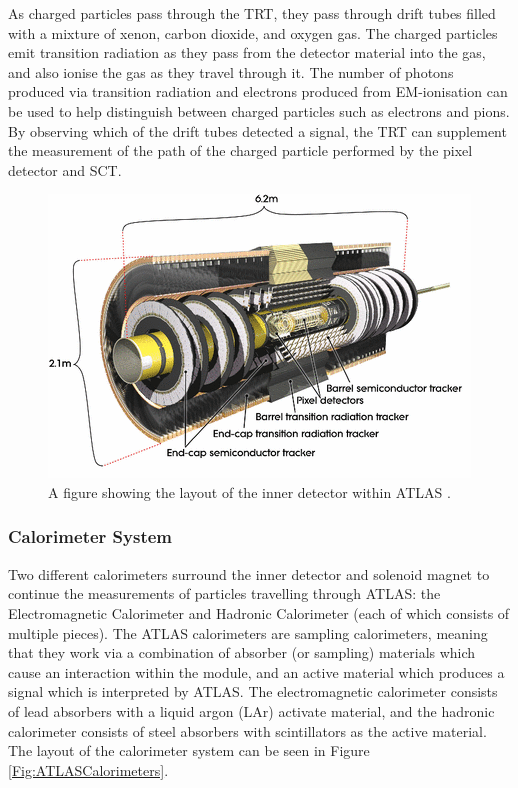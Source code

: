 \documentclass[12pt,a4paper,epsf,portrait,times,epsfig]{article}
\begin{document}
		As charged particles pass through the TRT, they pass through drift tubes filled with a mixture of xenon, carbon dioxide, and oxygen gas. The charged particles emit transition radiation as they pass from the detector material into the gas, and also ionise the gas as they travel through it. The number of photons produced via transition radiation and
		electrons produced from EM-ionisation can be used to help distinguish between charged	particles such as electrons and pions. By observing which of the drift tubes detected a	signal, the TRT can supplement the measurement of the path of the charged particle	performed by the pixel detector and SCT. \par
		
		
		\begin{figure}
			\centering
			\includegraphics[scale=0.7]{Inner_Detector}
			\caption{A figure showing the layout of the inner detector within ATLAS \cite{Article:ATLASDesignPaper}. }
			\label{Fig:InnerDetector}
		\end{figure}
		
		\subsubsection{Calorimeter System}
		
		Two different calorimeters surround the inner detector and solenoid magnet to continue the measurements of particles travelling through ATLAS: the Electromagnetic Calorimeter and Hadronic Calorimeter (each of which consists of multiple pieces). The ATLAS calorimeters are sampling calorimeters, meaning that they work via a combination of absorber (or sampling) materials which cause an interaction within the module, and an
		active material which produces a signal which is interpreted by ATLAS. The electromagnetic	calorimeter consists of lead absorbers with a liquid argon (LAr) activate material, and the hadronic calorimeter consists of steel absorbers with scintillators as the active material. The layout of the calorimeter system can be seen in Figure \ref{Fig:ATLASCalorimeters}. \par
		
\end{document}

